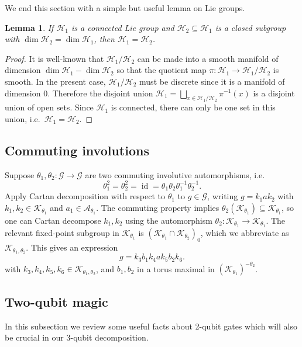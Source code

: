 \documentclass[reqno]{amsart}
\newtheorem{lemma}[theorem]{Lemma}
\theoremstyle{definition} \newtheorem{example}[theorem]{Example}
\DeclareMathOperator{\id}{id}
\newcommand{\G}{\mathcal{G}}
\renewcommand{\H}{\mathcal{H}}
\newcommand{\K}{\mathcal{K}}
\newcommand{\A}{\mathcal{A}}
\begin{document}
We end this section with a simple but useful lemma on Lie groups.
\begin{lemma} \label{lem:gp-eq} If $\H_1$ is a connected Lie group and $\H_2 \subseteq \H_1$ is a closed subgroup with $\dim \H_2 = \dim \H_1$, then $\H_1 = \H_2$. 
\end{lemma}
\begin{proof}
It is well-known that $\H_1/\H_2$ can be made into a smooth manifold of dimension $\dim \H_1 - \dim \H_2$ so that the quotient map $\pi : \H_1 \to \H_1/\H_2$ is smooth. In the present case, $\H_1/\H_2$ must be discrete since it is a manifold of dimension 0. Therefore the disjoint union $\H_1 = \bigsqcup_{x \in \H_1/\H_2} \pi^{-1}(x)$ is a disjoint union of open sets. Since $\H_1$ is connected, there can only be one set in this union, i.e.\ $\H_1 = \H_2$.
\end{proof}


\subsection{Commuting involutions} \label{subsec:commuting-cartan}
Suppose $\theta_1, \theta_2 : \G \to \G$ are two commuting involutive automorphisms, i.e.
\begin{equation*}
\theta_1^2 = \theta_2^2 = \id = \theta_1 \theta_2 \theta_1^{-1} \theta_2^{-1}.
\end{equation*}
Apply Cartan decomposition with respect to $\theta_1$ to $g \in \G$, writing $g = k_1 a  k_2$ with $k_1, k_2 \in \K_{\theta_1}$ and $a_1 \in \A_{\theta_1}$. The commuting property implies $\theta_2(\K_{\theta_1}) \subseteq \K_{\theta_1}$, so one can Cartan decompose $k_1, k_2$ using the automorphism $\theta_2 : \K_{\theta_1} \to \K_{\theta_1}$. The relevant fixed-point subgroup in $\K_{\theta_1}$ is $(\K_{\theta_1} \cap \K_{\theta_2})_0$, which we abbreviate as $\K_{\theta_1,\theta_2}$. This gives an expression
\begin{equation*}
g = k_3 b_1 k_4 a k_5 b_2 k_6.
\end{equation*}
with $k_3,k_4,k_5,k_6 \in \K_{\theta_1,\theta_2}$, and $b_1, b_2$ in a torus maximal in $(\K_{\theta_1})^{-\theta_2}$.


\subsection{Two-qubit magic} \label{subsec:magic}
In this subsection we review some useful facts about 2-qubit gates which will also be crucial in our 3-qubit decomposition.
\end{document}

